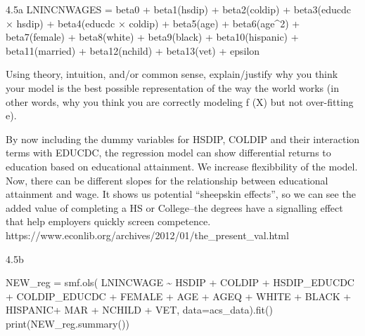\documentclass[
  11pt,
  letterpaper,
  DIV=11,
  numbers=noendperiod]{scrartcl}
\newenvironment{Shaded}{\begin{snugshade}}{\end{snugshade}}
\newcommand{\BuiltInTok}[1]{\textcolor[rgb]{0.00,0.23,0.31}{#1}}
\newcommand{\NormalTok}[1]{\textcolor[rgb]{0.00,0.23,0.31}{#1}}
\newcommand{\OperatorTok}[1]{\textcolor[rgb]{0.37,0.37,0.37}{#1}}
\newcommand{\StringTok}[1]{\textcolor[rgb]{0.13,0.47,0.30}{#1}}
\begin{document}
4.5a LNINCNWAGES = beta0 + beta1(hsdip) + beta2(coldip) + beta3(educdc ×
hsdip) + beta4(educdc × coldip) + beta5(age) + beta6(age\^{}2) +
beta7(female) + beta8(white) + beta9(black) + beta10(hispanic) +
beta11(married) + beta12(nchild) + beta13(vet) + epsilon

Using theory, intuition, and/or common sense, explain/justify why you
think your model is the best possible representation of the way the
world works (in other words, why you think you are correctly modeling f
(X) but not over-fitting e).

By now including the dummy variables for HSDIP, COLDIP and their
interaction terms with EDUCDC, the regression model can show
differential returns to education based on educational attainment. We
increase flexibbility of the model. Now, there can be different slopes
for the relationship between educational attainment and wage. It shows
us potential ``sheepskin effects'', so we can see the added value of
completing a HS or College--the degrees have a signalling effect that
help employers quickly screen competence.
https://www.econlib.org/archives/2012/01/the\_present\_val.html

4.5b

\begin{Shaded}
\begin{Highlighting}[]
\NormalTok{NEW\_reg }\OperatorTok{=}\NormalTok{ smf.ols(}
    \StringTok{\textquotesingle{}LNINCWAGE \textasciitilde{} HSDIP + COLDIP + HSDIP\_EDUCDC + COLDIP\_EDUCDC + FEMALE + AGE + AGEQ + WHITE + BLACK + HISPANIC+ MAR + NCHILD + VET\textquotesingle{}}\NormalTok{, data}\OperatorTok{=}\NormalTok{acs\_data).fit()}
\BuiltInTok{print}\NormalTok{(NEW\_reg.summary())}
\end{Highlighting}
\end{Shaded}
\end{document}
